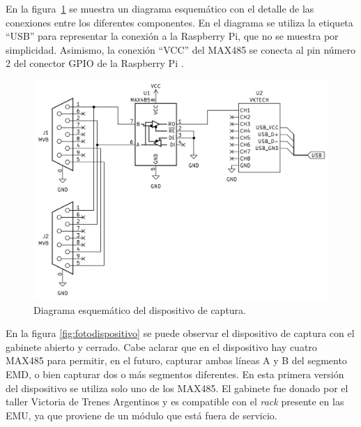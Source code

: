 En la figura~\ref{fig:esquematico} se muestra un diagrama esquemático con el detalle de las conexiones entre los diferentes componentes. En el diagrama se utiliza la etiqueta ``USB'' para representar la conexión a la Raspberry Pi, que no se muestra por simplicidad. Asimismo, la conexión ``VCC'' del MAX485 se conecta al pin número 2 del conector GPIO de la Raspberry Pi \cite{gpio}.

\begin{figure}[htbp]
	\centering
	\includegraphics[width=1\textwidth]{./Figures/esquematico.png}
	\caption{Diagrama esquemático del dispositivo de captura.}
    \label{fig:esquematico}
\end{figure}

En la figura \ref{fig:fotodispositivo} se puede observar el dispositivo de captura con el gabinete abierto y cerrado. Cabe aclarar que en el dispositivo hay cuatro MAX485 para permitir, en el futuro, capturar ambas líneas A y B del segmento EMD, o bien capturar dos o más segmentos diferentes. En esta primera versión del dispositivo se utiliza solo uno de los MAX485.
El gabinete fue donado por el taller Victoria de Trenes Argentinos y es compatible con el \textit{rack} presente en las EMU, ya que proviene de un módulo que está fuera de servicio.

